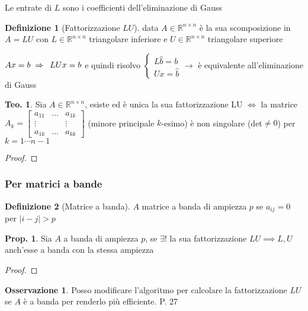 \documentclass[a4paper,10pt]{article}
\theoremstyle{definition}
\newcommand{\re}{\mathbb{R}} %
\theoremstyle{indentdefinition}
\newtheorem{defn}{Definizione}[section]
\theoremstyle{indenttheorem}
\newtheorem{thm}{Teo.}
\newtheorem{prop}{Prop.}
\theoremstyle{myremark}
\newtheorem*{rem*}{Osservazione}
\theoremstyle{indentgeneral}
\theoremstyle{plain}
\theoremstyle{plain}
\newenvironment{myboxed} 
{\noindent\begin{lrbox}{\mybox}\begin{minipage}{\textwidth}}
{\end{minipage}\end{lrbox}\fbox{\usebox{\mybox}}}
\begin{document}
Le entrate di $L$ sono i coefficienti dell'eliminazione di Gauss

\begin{defn}[Fattorizzazione $LU$]
    data $A\in\re^{n\times n}$ è la sua scomposizione in $A=LU$ con $L\in\re^{n\times n}$ triangolare inferiore e $U\in\re^{n\times n}$ triangolare superiore
\end{defn}

 $Ax=b\;\Rightarrow\enskip LUx=b$
e quindi risolvo $\left\{ \begin{array}{l}
L\hat{b}=b\\
Ux=\hat{b}
\end{array}\right. \longrightarrow$ è equivalente all'eliminazione di Gauss


%
\begin{thm}
Sia $A\in\re^{n\times n}$, esiste ed è unica la sua fattorizzazione LU $\iff$ la matrice $A_k=\begin{bmatrix}
a_{11} & \dots & a_{1k} \\
\vdots &  & \vdots \\
a_{1k} & \dots & a_{kk} 
\end{bmatrix} $ (minore principale $k$-esimo) è non singolare (det$\ne 0$) per $k=1\cdots n-1$
\end{thm}

\begin{proof}
\end{proof}

\subsubsection{Per matrici a bande}
\begin{defn}[Matrice a banda]
$A$ matrice a banda di ampiezza $p$ se $a_{ij}=0$ per $\left|i-j\right|>p$
\end{defn}

\begin{prop}
    Sia $A$ a banda di ampiezza $p$, se $\exists!$ la sua fattorizzazione $LU\implies L,U$ anch'esse a banda con la stessa ampiezza
\end{prop}
\begin{proof}
\end{proof}

\begin{myboxed}
\begin{rem*}
    Posso modificare l'algoritmo per calcolare la fattorizzazione $LU$ se $A$ è a banda per renderlo più efficiente. P. 27
\end{rem*}
\end{myboxed}
\end{document}
